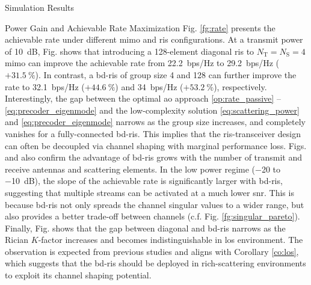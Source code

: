 \documentclass[journal]{IEEEtran}
\begin{document}
\begin{section}{Simulation Results}
\begin{subsection}{Power Gain and Achievable Rate Maximization}
		Fig. \ref{fg:rate} presents the achievable rate under different \gls{mimo} and \gls{ris} configurations.
		At a transmit power of \qty{10}{dB}, Fig.  shows that introducing a 128-element diagonal \gls{ris} to $N_\mathrm{T}=N_\mathrm{S}=4$ \gls{mimo} can improve the achievable rate from \qty{22.2}{bps/Hz} to \qty{29.2}{bps/Hz} ($+\qty{31.5}{\percent}$).
		In contrast, a \gls{bd}-\gls{ris} of group size 4 and 128 can further improve the rate to \qty{32.1}{bps/Hz} ($+\qty{44.6}{\percent}$) and \qty{34}{bps/Hz}  ($+\qty{53.2}{\percent}$), respectively.
		Interestingly, the gap between the optimal \gls{ao} approach \eqref{op:rate_passive} -- \eqref{eq:precoder_eigenmode} and the low-complexity solution \eqref{eq:scattering_power} and \eqref{eq:precoder_eigenmode} narrows as the group size increases, and completely vanishes for a fully-connected \gls{bd}-\gls{ris}.
		This implies that the \gls{ris}-transceiver design can often be decoupled via channel shaping with marginal performance loss.
		Figs.  and  also confirm the advantage of \gls{bd}-\gls{ris} grows with the number of transmit and receive antennas and scattering elements.
		In the low power regime (\num{-20} to \qty{-10}{dB}), the slope of the achievable rate is significantly larger with \gls{bd}-\gls{ris}, suggesting that multiple streams can be activated at a much lower \gls{snr}.
		This is because \gls{bd}-\gls{ris} not only spreads the channel singular values to a wider range, but also provides a better trade-off between channels (c.f. Fig. \ref{fg:singular_pareto}).
		Finally, Fig.  shows that the gap between diagonal and \gls{bd}-\gls{ris} narrows as the Rician $K$-factor increases and becomes indistinguishable in \gls{los} environment.
		The observation is expected from previous studies \cite{Shen2020a,Li2023b,Nerini2023} and aligns with Corollary \ref{co:los}, which suggests that the \gls{bd}-\gls{ris} should be deployed in rich-scattering environments to exploit its channel shaping potential.
	\end{subsection}
\end{section}
\end{document}
